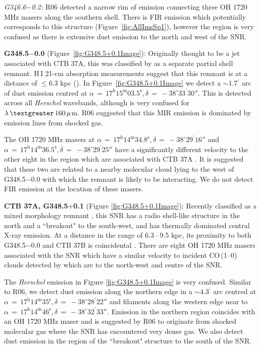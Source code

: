\documentclass[fleqn,usenatbib]{mnras}
\begin{document}
{\textit{G346.6$-$0.2:} R06 detected a narrow rim of emission connecting three OH 1720 MHz masers along the southern shell. There is FIR emission which potentially corresponds to this structure (Figure~\ref{fig:AllImsSp1}), however the region is very confused as there is extensive dust emission to the north and west of the SNR.
\bigskip

\textbf{G348.5$-$0.0} (Figure~\ref{fig:G348.5+0.1Image}): Originally thought to be a jet associated with CTB 37A, this was classified by \citet{Kassim1991} as a separate partial shell remnant.
H\,{\small I} 21-cm absorption measurements suggest that this remnant is at a distance of $\leq$6.3 kpc (\citealp{Tian2012}). In Figure~\ref{fig:G348.5+0.1Image} we detect a $\sim$1.7$^\prime$ arc of dust emission centred at $\alpha\,=\,17^\text{h}15^\text{m}03.5^\text{s}, \delta\,=\,-38^\circ33^\prime30''$. This is detected across all \textit{Herschel} wavebands, although is very confused for $\lambda\,\textgreater\,160\,\mu$m. R06 suggested that this MIR emission is dominated by emission lines from shocked gas.

The OH 1720 MHz masers at $\alpha\,=\,17^\text{h}14^\text{m}34.8^\text{s}, \delta\,=\,-38^\circ29^\prime16''$ and $\alpha\,=\,17^\text{h}14^\text{m}36.5^\text{s}, \delta\,=\,-38^\circ29^\prime25''$ have a significantly different velocity to the other eight in the region which are associated with CTB 37A \citep{Frail1996}. It is suggested that these two are related to a nearby molecular cloud \citep{Reynoso2000} lying to the west of G348.5$-$0.0 with which the remnant is likely to be interacting. We do not detect FIR emission at the location of these masers.
\bigskip

\textbf{CTB 37A, G348.5$+$0.1} (Figure \ref{fig:G348.5+0.1Image}): Recently classified as a mixed morphology remnant \citep{Sezer2011, Yamauchi2014}, this SNR has a radio shell-like structure in the north and a ``breakout" to the south-west, and has thermally dominated central X-ray emission. At a distance in the range of 6.3\,--\,9.5 kpc, its proximity to both G348.5$-$0.0 and CTB 37B is coincidental \citep{Tian2012}. There are eight OH 1720 MHz masers associated with the SNR which have a similar velocity to incident CO\,(1--0) clouds detected by \citet{Reynoso2000} which are to the north-west and centre of the SNR.

The \textit{Herschel} emission in Figure \ref{fig:G348.5+0.1Image} is very confused. Similar to R06, we detect dust emission along the northern edge in a $\sim4.3^\prime$ arc centred at $\alpha\,=\,17^\text{h}14^\text{m}35^\text{s}, \delta\,=\,-38^\circ28^\prime22''$ and filaments along the western edge near to $\alpha\,=\,17^\text{h}14^\text{m}46^\text{s}, \delta\,=\,-38^\circ32^\prime33''$. Emission in the northern region coincides with an OH 1720 MHz maser and is suggested by R06 to originate from shocked molecular gas where the SNR has encountered very dense gas. We also detect dust emission in the region of the ``breakout" structure to the south of the SNR.
\bigskip

}
\end{document}
